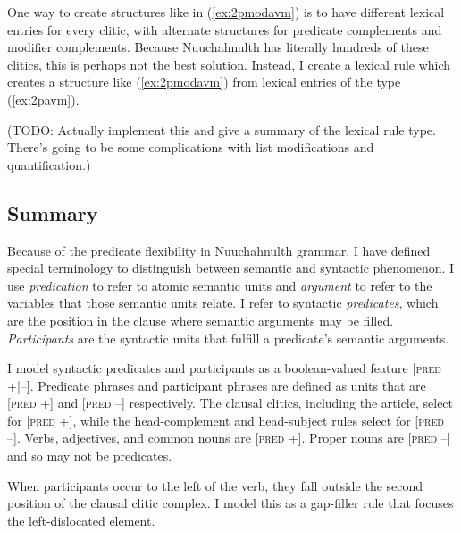 One way to create structures like in (\ref{ex:2pmodavm}) is to have different lexical entries for every clitic, with alternate structures for predicate complements and modifier complements. Because Nuuchahnulth has literally hundreds of these clitics, this is perhaps not the best solution. Instead, I create a lexical rule which creates a structure like (\ref{ex:2pmodavm}) from lexical entries of the type (\ref{ex:2pavm}).

\noindent (TODO: Actually implement this and give a summary of the lexical rule type. There's going to be some complications with list modifications and quantification.)

\subsection{Summary}

Because of the predicate flexibility in Nuuchahnulth grammar, I have defined special terminology to distinguish between semantic and syntactic phenomenon. I use \textit{predication} to refer to atomic semantic units and \textit{argument} to refer to the variables that those semantic units relate. I refer to syntactic \textit{predicates}, which are the position in the clause where semantic arguments may be filled. \textit{Participants} are the syntactic units that fulfill a predicate's semantic arguments.

I model syntactic predicates and participants as a boolean-valued feature [\textsc{pred} +|--]. Predicate phrases and participant phrases are defined as units that are [\textsc{pred} +] and [\textsc{pred} --] respectively. The clausal clitics, including the article, select for [\textsc{pred} +], while the head-complement and head-subject rules select for [\textsc{pred} --]. Verbs, adjectives, and common nouns are [\textsc{pred} +]. Proper nouns are [\textsc{pred} --] and so may not be predicates.

When participants occur to the left of the verb, they fall outside the second position of the clausal clitic complex. I model this as a gap-filler rule that focuses the left-dislocated element.
